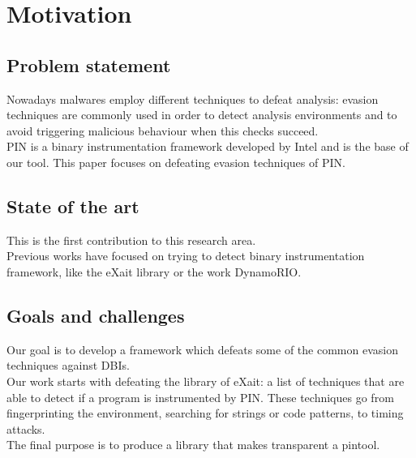 \chapter{Motivation}
\label{chapter2}
\thispagestyle{empty}

\section{Problem statement}
Nowadays malwares employ different techniques to defeat analysis: evasion techniques are commonly used in order to detect analysis environments and to avoid triggering malicious behaviour when this checks succeed.\\
PIN is a binary instrumentation framework developed by Intel and is the base of our tool. This paper focuses on defeating evasion techniques of PIN.
\section{State of the art}
This is the first contribution to this research area.\\
Previous works have focused on trying to detect binary instrumentation framework, like the eXait library or the work DynamoRIO.
\section{Goals and challenges}
Our goal is to develop a framework which defeats some of the common evasion techniques against DBIs.\\
Our work starts with defeating the library of eXait: a list of techniques that are able to detect if a program is instrumented by PIN. These techniques go from fingerprinting the environment, searching for strings or code patterns, to timing attacks.\\
The final purpose is to produce a library that makes transparent a pintool.
